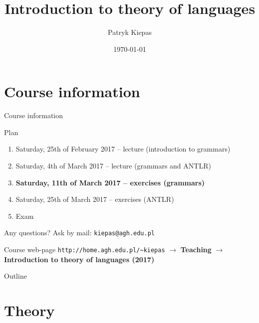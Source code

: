 \documentclass{beamer}
\title[Theory of languages]{Introduction to theory of languages}
\author{Patryk Kiepas}
\institute{MINES ParisTech \& AGH}
\date{\today}
\begin{document}

\begin{frame}
  \titlepage
\end{frame}

\section{Course information}


\begin{frame}[fragile]{Course information}

\begin{block}{Plan}
	\begin{enumerate}
		\item Saturday, 25th of February 2017 -- lecture (introduction to grammars)
		\item Saturday, 4th of March 2017 -- lecture (grammars and ANTLR)
		\item \textbf{Saturday, 11th of March 2017 -- exercises (grammars)}
		\item Saturday, 25th of March 2017 -- exercises (ANTLR)
		\item Exam
	\end{enumerate}
\end{block}

\begin{alertblock}{Any questions?}
	Ask by mail: \verb|kiepas@agh.edu.pl|
\end{alertblock}

\begin{alertblock}{Course web-page}
	\verb|http://home.agh.edu.pl/~kiepas| $\rightarrow$ \textbf{Teaching} $\rightarrow$ \textbf{Introduction to theory of languages (2017)}
\end{alertblock}

\end{frame}


\begin{frame}{Outline}
	\tableofcontents
\end{frame}

\section{Theory}
\end{document}
